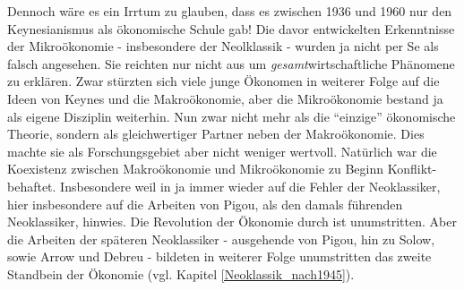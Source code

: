 Dennoch wäre es ein Irrtum zu glauben, dass es zwischen 1936 und 1960 nur den Keynesianismus als ökonomische Schule gab! 
Die davor entwickelten Erkenntnisse der Mikroökonomie - insbesondere der Neolklassik - wurden ja nicht per Se als falsch angesehen. Sie reichten nur nicht aus um \textit{gesamt}wirtschaftliche Phänomene zu erklären. Zwar stürzten sich viele junge Ökonomen in weiterer Folge auf die Ideen von Keynes und die Makroökonomie, aber die Mikroökonomie bestand ja als eigene Disziplin weiterhin. Nun zwar nicht mehr als die "`einzige"' ökonomische Theorie, sondern als gleichwertiger Partner neben der Makroökonomie. Dies machte sie als Forschungsgebiet aber nicht weniger wertvoll. Natürlich war die Koexistenz zwischen Makroökonomie und Mikroökonomie zu Beginn Konflikt-behaftet. Insbesondere weil in \textcite{Keynes1936} ja immer wieder auf die Fehler der Neoklassiker, hier insbesondere auf die Arbeiten von Pigou, als den damals führenden Neoklassiker, hinwies. Die Revolution der Ökonomie durch \textcite{Keynes1936} ist unumstritten. Aber die Arbeiten der späteren Neoklassiker - ausgehende von Pigou, hin zu Solow, sowie Arrow und Debreu - bildeten in weiterer Folge unumstritten das zweite Standbein der Ökonomie (vgl. Kapitel \ref{Neoklassik_nach1945}).